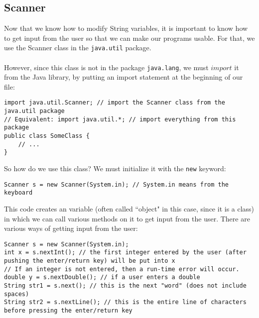 \subsection{Scanner}
Now that we know how to modify String variables, it is important to know how to get input from the user so that we can make our programs usable. For that, we use the Scanner class in the \verb|java.util| package.
\\ \\
However, since this class is not in the package \verb|java.lang|, we must $import$ it from the Java library, by putting an import statement at the beginning of our file:
\begin{lstlisting}
import java.util.Scanner; // import the Scanner class from the java.util package
// Equivalent: import java.util.*; // import everything from this package
public class SomeClass {
	// ...
}
\end{lstlisting}

\noindent So how do we use this class? We must initialize it with the \verb|new| keyword:
\begin{lstlisting}
Scanner s = new Scanner(System.in); // System.in means from the keyboard
\end{lstlisting}
\noindent This code creates an variable (often called ``object" in this case, since it is a class) in which we can call various methods on it to get input from the user. There are various ways of getting input from the user:

\begin{lstlisting}
Scanner s = new Scanner(System.in);
int x = s.nextInt(); // the first integer entered by the user (after pushing the enter/return key) will be put into x
// If an integer is not entered, then a run-time error will occur.
double y = s.nextDouble(); // if a user enters a double
String str1 = s.next(); // this is the next "word" (does not include spaces)
String str2 = s.nextLine(); // this is the entire line of characters before pressing the enter/return key
\end{lstlisting}

